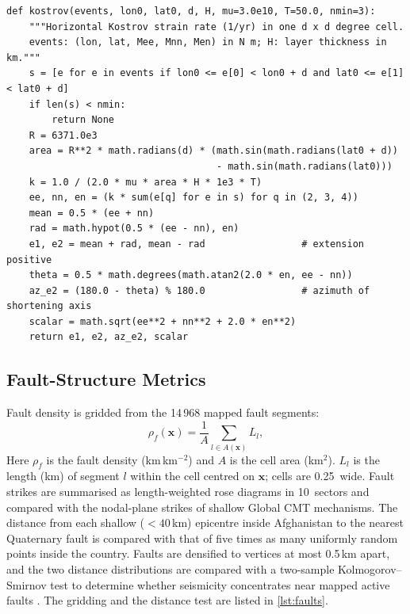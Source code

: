 \documentclass[11pt]{article}
\begin{document}
\begin{lstlisting}[caption={Kostrov summation of Global CMT moment tensors in one
grid cell, returning the principal horizontal strain rates, the azimuth of the
shortening axis and the scalar strain rate (Python 3, standard library).},label={lst:kostrov}]
def kostrov(events, lon0, lat0, d, H, mu=3.0e10, T=50.0, nmin=3):
    """Horizontal Kostrov strain rate (1/yr) in one d x d degree cell.
    events: (lon, lat, Mee, Mnn, Men) in N m; H: layer thickness in km."""
    s = [e for e in events if lon0 <= e[0] < lon0 + d and lat0 <= e[1] < lat0 + d]
    if len(s) < nmin:
        return None
    R = 6371.0e3
    area = R**2 * math.radians(d) * (math.sin(math.radians(lat0 + d))
                                     - math.sin(math.radians(lat0)))
    k = 1.0 / (2.0 * mu * area * H * 1e3 * T)
    ee, nn, en = (k * sum(e[q] for e in s) for q in (2, 3, 4))
    mean = 0.5 * (ee + nn)
    rad = math.hypot(0.5 * (ee - nn), en)
    e1, e2 = mean + rad, mean - rad                 # extension positive
    theta = 0.5 * math.degrees(math.atan2(2.0 * en, ee - nn))
    az_e2 = (180.0 - theta) % 180.0                 # azimuth of shortening axis
    scalar = math.sqrt(ee**2 + nn**2 + 2.0 * en**2)
    return e1, e2, az_e2, scalar
\end{lstlisting}

\subsection{Fault-Structure Metrics}
Fault density is gridded from the 14\,968 mapped fault segments:
\begin{equation}
  \rho_f(\mathbf{x}) = \frac{1}{A}\sum_{l \in A(\mathbf{x})} L_l, \label{eq:faultdens}
\end{equation}
Here $\rho_f$ is the fault density (km\,km$^{-2}$) and $A$ is the cell area (km$^2$).
$L_l$ is the length (km) of segment $l$ within the cell centred on $\mathbf{x}$; cells
are 0.25\textdegree\ wide. Fault strikes are summarised as length-weighted rose
diagrams in 10\textdegree\ sectors and compared with the nodal-plane strikes of
shallow Global CMT mechanisms. The distance from each shallow ($<40$\,km) epicentre
inside Afghanistan to the nearest Quaternary fault is compared with that of five
times as many uniformly random points inside the country. Faults are densified to
vertices at most 0.5\,km apart, and the two distance distributions are compared with
a two-sample Kolmogorov--Smirnov test to determine whether seismicity concentrates
near mapped active faults \cite{Ruleman2007, Styron2020}. The gridding and the
distance test are listed in \cref{lst:faults}.
\end{document}
